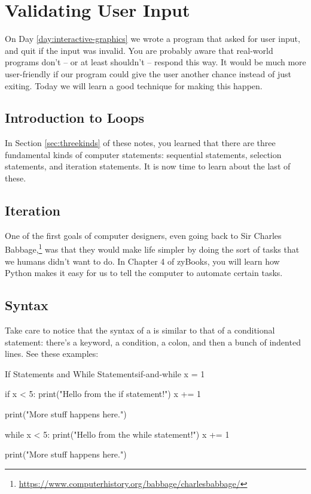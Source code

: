 
\chapter{Validating User Input}


\minitoc

On Day \ref{day:interactive-graphics} we wrote a program that asked for user input, and quit if the input was invalid.  You are probably aware that real-world programs don't -- or at least shouldn't -- respond this way.  It would be much more user-friendly if our program could give the user another chance instead of just exiting.  Today we will learn a good technique for making this happen.

\section{Introduction to Loops}

In Section \ref{sec:threekinds} of these notes, you learned that there are three fundamental kinds of computer statements: sequential statements, selection statements, and iteration statements.  It is now time to learn about the last of these.

\section{Iteration}

One of the first goals of computer designers, even going back to Sir Charles Babbage,\footnote{\url{https://www.computerhistory.org/babbage/charlesbabbage/}} was that they would make life simpler by doing the sort of tasks that we humans didn't want to do.  In Chapter 4 of zyBooks, you will learn how Python makes it easy for us to tell the computer to automate certain tasks.

\section{Syntax}

Take care to notice that the syntax of a  is similar to that of a conditional statement: there's a keyword, a condition, a colon, and then a bunch of indented lines.  See these examples:

\begin{py}{If Statements and While Statements}{if-and-while}
x = 1

if x < 5:
    print("Hello from the if statement!")
    x += 1

print("More stuff happens here.")

while x < 5:
    print("Hello from the while statement!")
    x += 1

print("More stuff happens here.")
\end{py}

